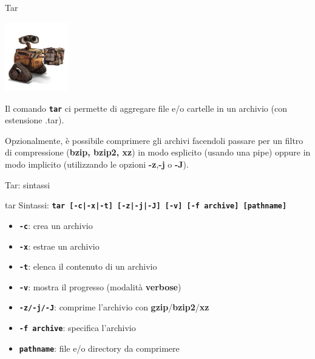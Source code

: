 \documentclass{beamer}
\begin{document}
    \begin{frame}{Tar}
        \begin{center}
            \includegraphics[height=3cm, keepaspectratio]{images/walle.png}
        \end{center}
        Il comando \texttt{\textbf{tar}} ci permette di aggregare file e/o cartelle in un archivio (con estensione .tar).
        
        \vspace{0.5cm}

        Opzionalmente, è possibile comprimere gli archivi facendoli
        passare per un filtro di compressione (\textbf{bzip, bzip2, xz}) in
        modo esplicito (usando una pipe) oppure in modo implicito (utilizzando le opzioni \textbf{-z},\textbf{-j} o \textbf{-J}).
    \end{frame}

    \begin{frame}{Tar: sintassi}
        \begin{block}{tar}
            \small
            Sintassi: \texttt{\textbf{tar [-c|-x|-t] [-z|-j|-J] [-v] [-f archive] [pathname]}}
            
            \begin{itemize}
                \item \texttt{\textbf{-c}}: crea un archivio
                \item \texttt{\textbf{-x}}: estrae un archivio
                \item \texttt{\textbf{-t}}: elenca il contenuto di un archivio
                \item \texttt{\textbf{-v}}: mostra il progresso (modalità \textbf{verbose})
                \item \texttt{\textbf{-z/-j/-J}}: comprime l'archivio con \textbf{gzip}/\textbf{bzip2}/\textbf{xz}
                \item \texttt{\textbf{-f archive}}: specifica l'archivio
                \item \texttt{\textbf{pathname}}: file e/o directory da comprimere
            \end{itemize}
        \end{block}
    \end{frame}
\end{document}
